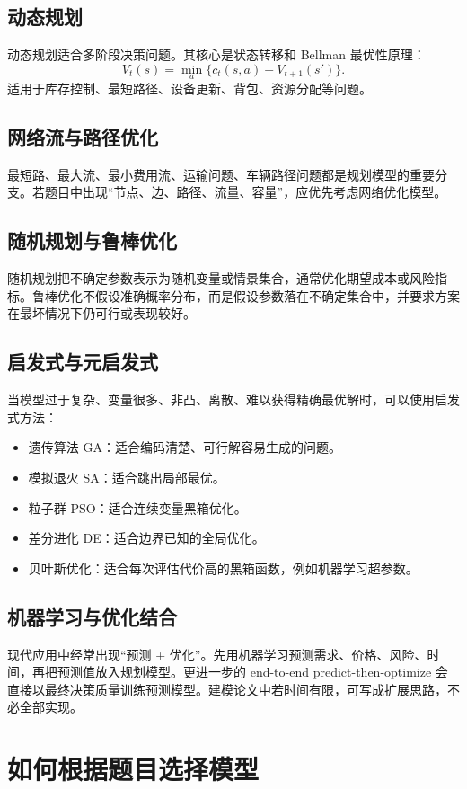 \documentclass[11pt,a4paper]{ctexart}
\begin{document}
\subsection{动态规划}
动态规划适合多阶段决策问题。其核心是状态转移和 Bellman 最优性原理：
\[
V_t(s)=\min_a\{c_t(s,a)+V_{t+1}(s')\}.
\]
适用于库存控制、最短路径、设备更新、背包、资源分配等问题。

\subsection{网络流与路径优化}
最短路、最大流、最小费用流、运输问题、车辆路径问题都是规划模型的重要分支。若题目中出现“节点、边、路径、流量、容量”，应优先考虑网络优化模型。

\subsection{随机规划与鲁棒优化}
随机规划把不确定参数表示为随机变量或情景集合，通常优化期望成本或风险指标。鲁棒优化不假设准确概率分布，而是假设参数落在不确定集合中，并要求方案在最坏情况下仍可行或表现较好。

\subsection{启发式与元启发式}
当模型过于复杂、变量很多、非凸、离散、难以获得精确最优解时，可以使用启发式方法：
\begin{itemize}
\item 遗传算法 GA：适合编码清楚、可行解容易生成的问题。
\item 模拟退火 SA：适合跳出局部最优。
\item 粒子群 PSO：适合连续变量黑箱优化。
\item 差分进化 DE：适合边界已知的全局优化。
\item 贝叶斯优化：适合每次评估代价高的黑箱函数，例如机器学习超参数。
\end{itemize}

\subsection{机器学习与优化结合}
现代应用中经常出现“预测 + 优化”。先用机器学习预测需求、价格、风险、时间，再把预测值放入规划模型。更进一步的 end-to-end predict-then-optimize 会直接以最终决策质量训练预测模型。建模论文中若时间有限，可写成扩展思路，不必全部实现。

\section{如何根据题目选择模型}
\end{document}
